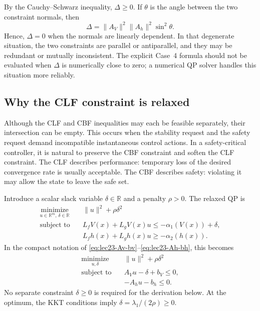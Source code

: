 \documentclass[../../master-handout.tex]{subfiles}
\begin{document}
By the Cauchy--Schwarz inequality, $\Delta\geq 0$. If $\theta$ is the angle between the two constraint normals, then
\begin{equation}
    \Delta
    =
    \|A_V\|^2\|A_h\|^2\sin^2\theta.
\end{equation}
Hence, $\Delta=0$ when the normals are linearly dependent. In that degenerate situation, the two constraints are parallel or antiparallel, and they may be redundant or mutually inconsistent. The explicit Case~4 formula should not be evaluated when $\Delta$ is numerically close to zero; a numerical QP solver handles this situation more reliably.

\subsection{Why the CLF constraint is relaxed}

Although the CLF and CBF inequalities may each be feasible separately, their intersection can be empty. This occurs when the stability request and the safety request demand incompatible instantaneous control actions. In a safety-critical controller, it is natural to preserve the CBF constraint and soften the CLF constraint. The CLF describes performance: temporary loss of the desired convergence rate is usually acceptable. The CBF describes safety: violating it may allow the state to leave the safe set.

Introduce a scalar slack variable $\delta\in\mathbb{R}$ and a penalty $\rho>0$. The relaxed QP is
\begin{equation}
\begin{aligned}
    \underset{u\in\mathbb{R}^{m},\,\delta\in\mathbb{R}}{\operatorname{minimize}}
    \quad&
    \|u\|^2+\rho\delta^2
    \\
    \text{subject to}
    \quad&
    L_fV(x)+L_gV(x)u
    \leq
    -\alpha_1\!\left(V(x)\right)+\delta,
    \\
    &
    L_fh(x)+L_gh(x)u
    \geq
    -\alpha_2\!\left(h(x)\right).
\end{aligned}
\label{eq:lec23-relaxed-qp}
\end{equation}
In the compact notation of \eqref{eq:lec23-Av-bv}--\eqref{eq:lec23-Ah-bh}, this becomes
\begin{equation}
\begin{aligned}
    \underset{u,\delta}{\operatorname{minimize}}
    \quad&
    \|u\|^2+\rho\delta^2
    \\
    \text{subject to}
    \quad&
    A_Vu-\delta+b_V\leq 0,
    \\
    &
    -A_hu-b_h\leq 0.
\end{aligned}
\label{eq:lec23-relaxed-compact}
\end{equation}
No separate constraint $\delta\geq 0$ is required for the derivation below. At the optimum, the KKT conditions imply $\delta=\lambda_1/(2\rho)\geq 0$.
\end{document}
